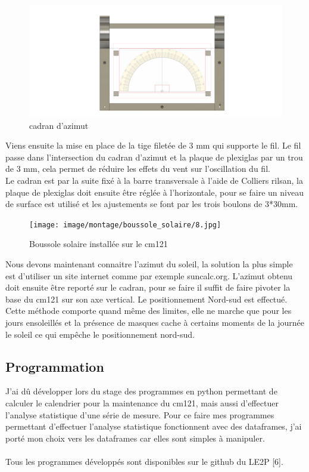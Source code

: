 \documentclass[12pt,a4paper]{article}
\begin{document}
\begin{flushleft}
\begin{figure}[H]
\centering
\includegraphics[width=12cm]{image/montage/boussole_solaire/5.png} 
\caption{cadran d'azimut}
\end{figure}


Viens ensuite la mise en place de la tige filetée de 3 mm qui supporte le fil. Le fil passe dans l'intersection du cadran d'azimut et la plaque de plexiglas par un trou de 3 mm, cela permet de réduire les effets du vent sur l'oscillation du fil.\\
Le cadran est par la suite fixé à la barre transversale à l'aide de Colliers rilsan, la plaque de plexiglas doit ensuite être réglée à l'horizontale, pour se faire un niveau de surface est utilisé et les ajustements se font par les trois boulons de 3*30mm.

 \begin{figure}[H]
\centering
\texttt{[image: image/montage/boussole\_solaire/8.jpg]} 
\caption{Boussole solaire installée sur le cm121}  
\end{figure}


Nous devons maintenant connaitre l'azimut du soleil, la solution la plus simple est d'utiliser un site internet comme par exemple suncalc.org. L'azimut obtenu doit ensuite être reporté sur le cadran, pour se faire il suffit de faire pivoter la base du cm121 sur son axe vertical. Le positionnement Nord-sud est effectué.\\
Cette méthode comporte quand même des limites, elle ne marche que pour les jours ensoleillés et la présence de masques cache à certains moments de la journée le soleil ce qui empêche le positionnement nord-sud. 
 

\subsection{Programmation}

J'ai dû développer lors du stage des programmes en python permettant de calculer le calendrier pour la maintenance du cm121, mais aussi d'effectuer l'analyse statistique d'une série de mesure.  Pour ce faire mes programmes permettant d'effectuer l'analyse statistique fonctionnent avec des dataframes, j'ai porté mon choix vers les dataframes car elles sont simples à manipuler.\\
~\\
Tous les programmes développés sont disponibles sur le github du LE2P [6].


\end{flushleft}
\end{document}

